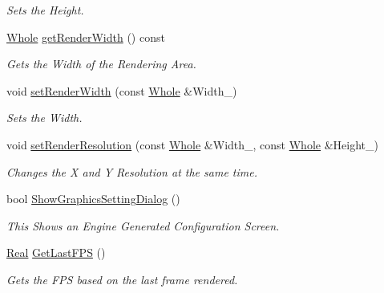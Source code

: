 \begin{DoxyCompactItemize}
\begin{DoxyCompactList}\small\item\em Sets the Height. \item\end{DoxyCompactList}\item 
\hyperlink{namespacephys_a460f6bc24c8dd347b05e0366ae34f34a}{Whole} \hyperlink{classphys_1_1GraphicsManager_a9e1ce1f9f8bcff7712fd5beaf7cf2337}{getRenderWidth} () const 
\begin{DoxyCompactList}\small\item\em Gets the Width of the Rendering Area. \item\end{DoxyCompactList}\item 
void \hyperlink{classphys_1_1GraphicsManager_aea5fb5808a23fa29c8522c396ac0d6b5}{setRenderWidth} (const \hyperlink{namespacephys_a460f6bc24c8dd347b05e0366ae34f34a}{Whole} \&Width\_\-)
\begin{DoxyCompactList}\small\item\em Sets the Width. \item\end{DoxyCompactList}\item 
void \hyperlink{classphys_1_1GraphicsManager_ac6feb044d9ab394f3e65d51026a899a6}{setRenderResolution} (const \hyperlink{namespacephys_a460f6bc24c8dd347b05e0366ae34f34a}{Whole} \&Width\_\-, const \hyperlink{namespacephys_a460f6bc24c8dd347b05e0366ae34f34a}{Whole} \&Height\_\-)
\begin{DoxyCompactList}\small\item\em Changes the X and Y Resolution at the same time. \item\end{DoxyCompactList}\item 
bool \hyperlink{classphys_1_1GraphicsManager_adcded385b6442aa5da6097f1edd5471a}{ShowGraphicsSettingDialog} ()
\begin{DoxyCompactList}\small\item\em This Shows an Engine Generated Configuration Screen. \item\end{DoxyCompactList}\item 
\hyperlink{namespacephys_af7eb897198d265b8e868f45240230d5f}{Real} \hyperlink{classphys_1_1GraphicsManager_ac1b8450e3cb7d83d0414322fcf403421}{GetLastFPS} ()
\begin{DoxyCompactList}\small\item\em Gets the FPS based on the last frame rendered. \item\end{DoxyCompactList}\item 

\end{DoxyCompactItemize}
